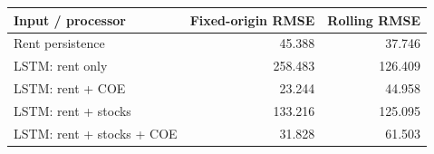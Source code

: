 \begin{tabular}{lrr}
\toprule
Input / processor & Fixed-origin RMSE & Rolling RMSE \\
\midrule
Rent persistence & 45.388 & 37.746 \\
LSTM: rent only & 258.483 & 126.409 \\
LSTM: rent + COE & 23.244 & 44.958 \\
LSTM: rent + stocks & 133.216 & 125.095 \\
LSTM: rent + stocks + COE & 31.828 & 61.503 \\
\bottomrule
\end{tabular}
